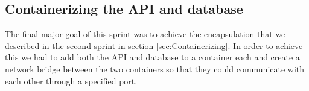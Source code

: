\subsection{Containerizing the API and database}
The final major goal of this sprint was to achieve the encapsulation that we described in the second sprint in section \ref{sec:Containerizing}. In order to achieve this we had to add both the API and database to a container each and create a network bridge between the two containers so that they could communicate with each other through a specified port.